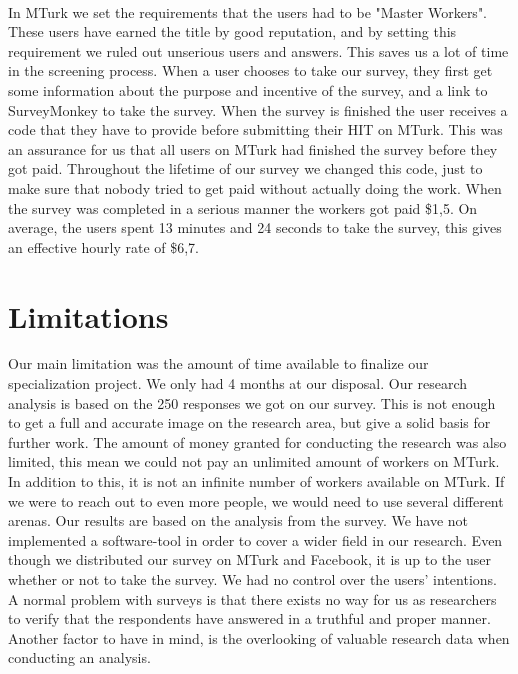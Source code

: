 \paragraph{}
In MTurk we set the requirements that the users had to be "Master Workers". These users have earned the title by good reputation, and by setting this requirement we ruled out unserious users and answers. This saves us a lot of time in the screening process. When a user chooses to take our survey, they first get some information about the purpose and incentive of the survey, and a link to SurveyMonkey to take the survey. When the survey is finished the user receives a code that they have to provide before submitting their HIT on MTurk. This was an assurance for us that all users on MTurk had finished the survey before they got paid. Throughout the lifetime of our survey we changed this code, just to make sure that nobody tried to get paid without actually doing the work. When the survey was completed in a serious manner the workers got paid \$1,5. On average, the users spent 13 minutes and 24 seconds to take the survey, this gives an effective hourly rate of \$6,7. 

\section{Limitations} 
Our main limitation was the amount of time available to finalize our specialization project. We only had 4 months at our disposal. Our research analysis is based on the 250 responses we got on our survey. This is not enough to get a full and accurate image on the research area, but give a solid basis for further work. The amount of money granted for conducting the research was also limited, this mean we could not pay an unlimited amount of workers on MTurk. In addition to this, it is not an infinite number of workers available on MTurk. If we were to reach out to even more people, we would need to use several different arenas. Our results are based on the analysis from the survey. We have not implemented a software-tool in order to cover a wider field in our research. Even though we distributed our survey on MTurk and Facebook, it is up to the user whether or not to take the survey. We had no control over the users' intentions. A normal problem with surveys is that there exists no way for us as researchers to verify that the respondents have answered in a truthful and proper manner. Another factor to have in mind, is the overlooking of valuable research data when conducting an analysis. 


